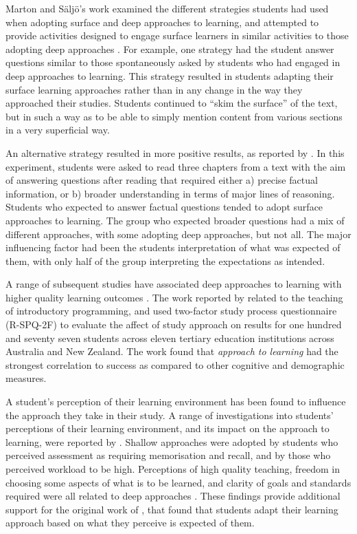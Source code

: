 Marton and S\"{a}lj\"{o}'s work examined the different strategies students had used when adopting surface and deep approaches to learning, and attempted to provide activities designed to engage surface learners in similar activities to those adopting deep approaches \cite{Marton:2005}. For example, one strategy had the student answer questions similar to those spontaneously asked by students who had engaged in deep approaches to learning.  This strategy resulted in students adapting their surface learning approaches rather than in any change in the way they approached their studies. Students continued to ``skim the surface'' of the text, but in such a way as to be able to simply mention content from various sections in a very superficial way. 

An alternative strategy resulted in more positive results, as reported by \cite{Marton:1976b}. In this experiment, students were asked to read three chapters from a text with the aim of answering questions after reading that required either a) precise factual information, or b) broader understanding in terms of major lines of reasoning. Students who expected to answer factual questions tended to adopt surface approaches to learning. The group who expected broader questions had a mix of different approaches, with some adopting deep approaches, but not all. The major influencing factor had been the students interpretation of what was expected of them, with only half of the group interpreting the expectations as intended. 


A range of subsequent studies have associated deep approaches to learning with higher quality learning outcomes \cite{Rossum:1984,Prosser:1989,Trigwell:1991,Ramsden:1992,Marton:2005,DeRaadt:2005}. The work reported by \citet{DeRaadt:2005} related to the teaching of introductory programming, and used \citet{Biggs:2001} two-factor study process questionnaire (R-SPQ-2F) to evaluate the affect of study approach on results for one hundred and seventy seven students across eleven tertiary education institutions across Australia and New Zealand. The work found that \emph{approach to learning} had the strongest correlation to success as compared to other cognitive and demographic measures.

A student's perception of their learning environment has been found to influence the approach they take in their study. A range of investigations into students' perceptions of their learning environment, and its impact on the approach to learning, were reported by \citet{Ramsden:1992}. Shallow approaches were adopted by students who perceived assessment as requiring memorisation and recall, and by those who perceived workload to be high. Perceptions of high quality teaching, freedom in choosing some aspects of what is to be learned, and clarity of goals and standards required were all related to deep approaches \cite{Trigwell:1991,Ramsden:1992,Trigwell:1999}. These findings provide additional support for the original work of \cite{Marton:1976b}, that found that students adapt their learning approach based on what they perceive is expected of them.

